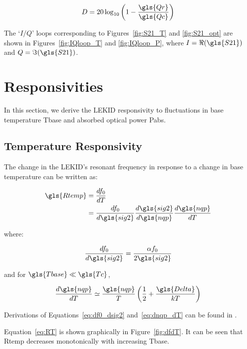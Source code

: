 \begin{equation}\label{eq:dip_depth}
  D = 20\log_{10}\left( 1 - \frac{\gls{Qr}}{\gls{Qc}}\right)
\end{equation}

The `$I/Q$' loops corresponding to Figures~\ref{fig:S21_T} and \ref{fig:S21_opt} are shown in Figures~\ref{fig:IQloop_T} and \ref{fig:IQloop_P}, where $I = \Re(\gls{S21})$ and $Q = \Im(\gls{S21})$.

\section{Responsivities}\label{sec:responsivity}

In this section, we derive the LEKID responsivity to fluctuations in base temperature \gls{Tbase} and absorbed optical power \gls{Pabs}.

\subsection{Temperature Responsivity}

The change in the LEKID's resonant frequency in response to a change in base temperature can be written as:

\begin{equation}\label{eq:RT}
  \begin{aligned}
  \gls{Rtemp} &= \frac{df_{0}}{dT} \\
              &= \frac{df_{0}}{d\gls{sig2}} \frac{d\gls{sig2}}{d\gls{nqp}} \frac{d\gls{nqp}}{dT}
  \end{aligned}
\end{equation}

where:

\begin{equation}\label{eq:df0_dsig2}
  \frac{df_{0}}{d\gls{sig2}} = \frac{\alpha f_{0}}{2\gls{sig2}}
\end{equation}

and for $\gls{Tbase} \ll \gls{Tc}$,

\begin{equation}\label{eq:dnqp_dT}
  \frac{d\gls{nqp}}{dT} \simeq \frac{\gls{nqp}}{T} \left(\frac{1}{2} + \frac{\gls{Delta}}{kT} \right)
\end{equation}

Derivations of Equations~\ref{eq:df0_dsig2} and~\ref{eq:dnqp_dT} can be found in \citet{mauskopf2018transition}.

Equation~\ref{eq:RT} is shown graphically in Figure~\ref{fig:dfdT}. It can be seen that \gls{Rtemp} decreases monotonically with increasing \gls{Tbase}.

